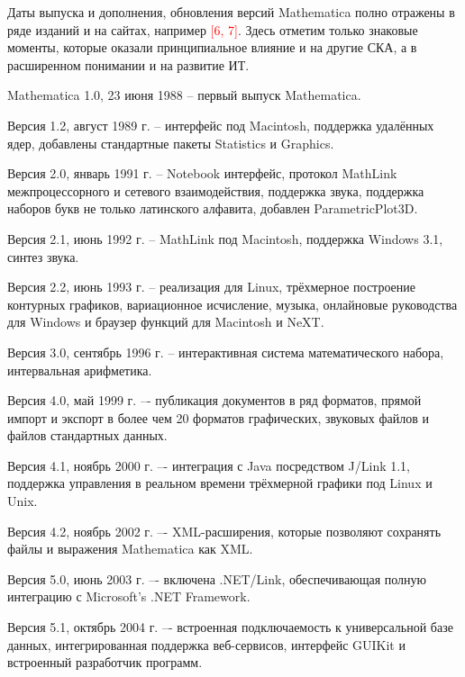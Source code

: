 Даты выпуска и дополнения, обновления версий Mathematica полно отражены в ряде изданий и на сайтах, например \textcolor{red}{[6, 7]}. 
Здесь отметим только знаковые моменты, которые оказали принципиальное влияние и на другие СКА, а в расширенном понимании и на развитие ИТ.
\begin{textitemize}
	\item Mathematica 1.0, 23 июня 1988 -- первый выпуск Mathematica.
	\item Версия 1.2, август 1989 г. -- интерфейс под Macintosh, поддержка удалённых ядер, добавлены стандартные пакеты Statistics и Graphics.
	\item Версия 2.0, январь 1991 г. -- Notebook интерфейс, протокол MathLink межпроцессорного и сетевого взаимодействия, поддержка звука, поддержка наборов букв не только латинского алфавита, добавлен ParametricPlot3D.
	\item Версия 2.1, июнь 1992 г. -- MathLink под Macintosh, поддержка Windows 3.1, синтез звука.
	\item Версия 2.2, июнь 1993 г. -- реализация для Linux, трёхмерное построение контурных графиков, вариационное исчисление, музыка, онлайновые руководства для Windows и браузер функций для Macintosh и NeXT.
	\item Версия 3.0, сентябрь 1996 г. -- интерактивная система математического набора, интервальная арифметика.
	\item Версия 4.0, май 1999 г. –- публикация документов в ряд форматов, прямой импорт и экспорт в более чем 20 форматов графических, звуковых файлов и файлов стандартных данных.
	\item Версия 4.1, ноябрь 2000 г. –- интеграция с Java посредством J/Link 1.1, поддержка управления в реальном времени трёхмерной графики под Linux и Unix.
	\item Версия 4.2, ноябрь 2002 г. –- XML-расширения, которые позволяют сохранять файлы и выражения Mathematica как XML.
	\item Версия 5.0, июнь 2003 г. –- включена .NET/Link, обеспечивающая полную интеграцию с Microsoft’s .NET Framework.
	\item Версия 5.1, октябрь 2004 г. –- встроенная подключаемость к универсальной базе данных, интегрированная поддержка веб-сервисов, интерфейс GUIKit и встроенный разработчик программ.

\end{textitemize}
